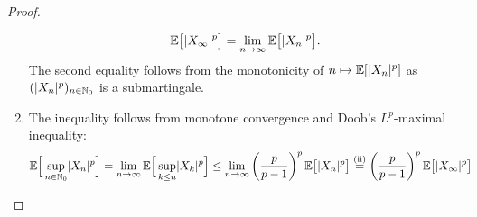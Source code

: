 \begin{proof}[Proof]
\begin{enumerate}[label=(\roman*)]
	\begin{align*}
		\mathbb{E}\big[\lvert X_{\infty}\rvert^p\big] = \lim_{n\to\infty} \mathbb{E}\big[\lvert X_n \rvert^p\big].
	\end{align*}
	The second equality follows from the monotonicity of $n\mapsto \mathbb{E}[|X_n|^p]$ as $(|X_n|^p)_{n\in \mathbb{N}_0}$ is a submartingale.
	\item
	The inequality follows from monotone convergence and Doob's $L^p$-maximal inequality:
	\begin{align*}
		\mathbb{E}\Big[ \sup\limits_{n\in\mathbb{N}_0} \lvert X_n \rvert^p \Big]
		&= \lim_{n\to\infty} \mathbb{E} \Big[ \sup\limits_{k\leq n} \lvert X_k \rvert^p \Big] 
		\leq \lim_{n\to\infty} \left( \frac{p}{p-1} \right)^p \mathbb{E}\big[\lvert X_n \rvert^p\big]
		\overset{\text{(ii)}}{=} \left( \frac{p}{p-1} \right)^p \mathbb{E}\big[\lvert X_{\infty} \rvert^p\big]
	\end{align*}
	\end{enumerate}
\end{proof}

